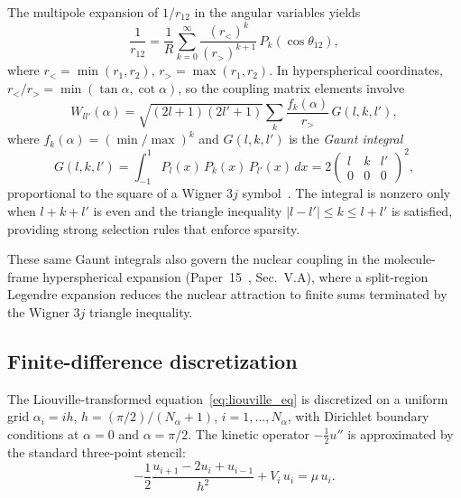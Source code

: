 \documentclass[aps,pra,twocolumn,superscriptaddress,longbibliography]{revtex4-2}
\begin{document}
The multipole expansion of $1/r_{12}$ in the angular
variables yields
\begin{equation}
  \frac{1}{r_{12}} = \frac{1}{R}\sum_{k=0}^{\infty}
  \frac{(r_<)^k}{(r_>)^{k+1}}\,P_k(\cos\theta_{12}),
  \label{eq:multipole}
\end{equation}
where $r_< = \min(r_1, r_2)$, $r_> = \max(r_1, r_2)$.  In
hyperspherical coordinates, $r_</r_> = \min(\tan\alpha,
\cot\alpha)$, so the coupling matrix elements involve
\begin{equation}
  W_{ll'}(\alpha) = \sqrt{(2l+1)(2l'+1)}\sum_k
  \frac{f_k(\alpha)}{r_>}\,G(l, k, l'),
  \label{eq:Wll}
\end{equation}
where $f_k(\alpha) = (\min/\max)^k$ and $G(l, k, l')$ is the
\emph{Gaunt integral}
\begin{equation}
  G(l, k, l') = \int_{-1}^{1} P_l(x)\,P_k(x)\,P_{l'}(x)\,dx
  = 2\begin{pmatrix} l & k & l' \\ 0 & 0 & 0\end{pmatrix}^{\!2},
  \label{eq:gaunt}
\end{equation}
proportional to the square of a Wigner $3j$
symbol~\cite{Varshalovich1988}.  The integral is nonzero only when
$l + k + l'$ is even and the triangle inequality $|l - l'| \leq k
\leq l + l'$ is satisfied, providing strong selection rules that
enforce sparsity.

These same Gaunt integrals also govern the nuclear coupling
in the molecule-frame hyperspherical expansion
(Paper~15~\cite{loutey_paper15}, Sec.~V.A), where a split-region
Legendre expansion reduces the nuclear attraction to finite sums
terminated by the Wigner $3j$ triangle inequality.

\subsection{Finite-difference discretization}

The Liouville-transformed equation~\eqref{eq:liouville_eq} is
discretized on a uniform grid $\alpha_i = ih$, $h = (\pi/2)/(N_\alpha
+ 1)$, $i = 1, \ldots, N_\alpha$, with Dirichlet boundary
conditions at $\alpha = 0$ and $\alpha = \pi/2$.  The kinetic
operator $-\frac{1}{2}u''$ is approximated by the standard
three-point stencil:
\begin{equation}
  -\frac{1}{2}\frac{u_{i+1} - 2u_i + u_{i-1}}{h^2}
  + V_i\,u_i = \mu\,u_i.
  \label{eq:fd_stencil}
\end{equation}
\end{document}
